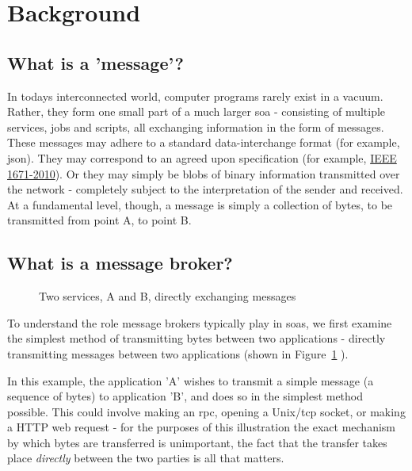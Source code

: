 \section{Background}
\label{sec:Background}

\subsection{What is a 'message'?}
\label{sub:What is a 'message'?}

In todays interconnected world, computer programs rarely exist in a vacuum.
Rather, they form one small part of a much larger \gls{soa}\cite{soa_2015} -
consisting of multiple services, jobs and scripts, all exchanging information in
the form of messages. These messages may adhere to a standard data-interchange
format (for example, \gls{json}). They may correspond to an agreed upon
specification (for example, \href{https://goo.gl/rjuP4C}{IEEE 1671-2010}).
Or they may simply be blobs of binary information transmitted over the network -
completely subject to the interpretation of the sender and received.
At a fundamental level, though, a message is simply a collection of bytes, to be
transmitted from point A, to point B.

\subsection{What is a message broker?}
\label{sub:What is a message broker?}

\begin{figure}
  
  \caption{Two services, A and B, directly exchanging messages}
  \label{fig:tikz:directMessaging}
\end{figure}

To understand the role message brokers typically play in \glspl{soa}, we first
examine the simplest method of transmitting bytes between two applications -
directly transmitting messages between two applications (shown in
Figure~\ref{fig:tikz:directMessaging} ).

In this example, the application 'A' wishes to transmit a simple message
(a sequence of bytes) to application 'B', and does so in the simplest method
possible. This could involve making an \gls{rpc}, opening a Unix/\gls{tcp} socket,
or making a HTTP web request - for the purposes of this illustration the exact
mechanism by which bytes are transferred is unimportant, the fact
that the transfer takes place \emph{directly} between the two parties is all that
matters.
